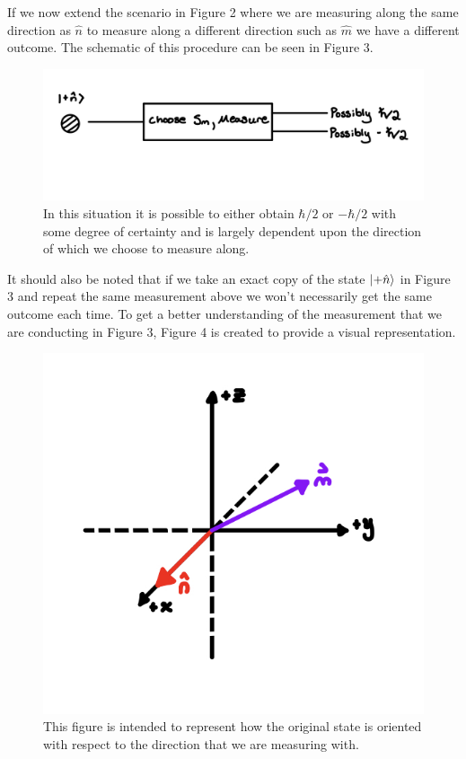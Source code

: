 \documentclass[twocolumn]{article}
\begin{document}
\newline
If we now extend the scenario in Figure 2 where we are measuring along the same direction as $\hat{n}$ to measure along a different direction such as $\hat{m}$ we have a different outcome. The schematic of this procedure can be seen in Figure 3.
\begin{figure}[htbp]
\begin{center}
\includegraphics[width=1.00\linewidth]{Spin-With-M-Direction.jpg}
\caption{In this situation it is possible to either obtain $\hbar/2$ or $-\hbar/2$ with some degree of certainty and is largely dependent upon the direction of which we choose to measure along.}
\end{center}
\end{figure}
\newline
It should also be noted that if we take an exact copy of the state $\ket{+\hat{n}}$ in Figure 3 and repeat the same measurement above we won't necessarily get the same outcome each time. To get a better understanding of the measurement that we are conducting in Figure 3, Figure 4 is created to provide a visual representation.
\begin{figure}[htbp]
\begin{center}
\includegraphics[width=0.75\linewidth]{Spin-With-M-and-N-Graph.jpg}
\caption{This figure is intended to represent how the original state is oriented with respect to the direction that we are measuring with.}
\end{center}
\end{figure}
\end{document}
